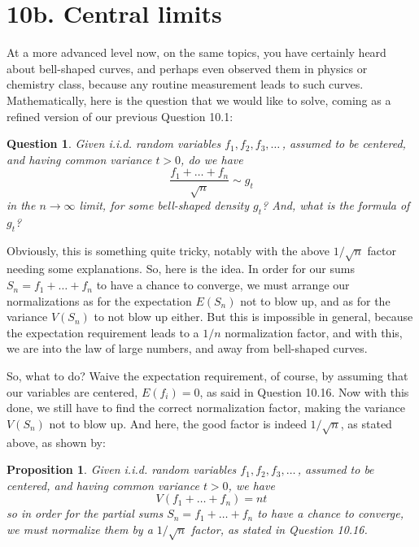 \documentclass[12pt]{amsbook}
\newtheorem{proposition}[theorem]{Proposition}
\newtheorem{question}[theorem]{Question}
\begin{document}
\section*{10b. Central limits}

At a more advanced level now, on the same topics, you have certainly heard about bell-shaped curves, and perhaps even observed them in physics or chemistry class, because any routine measurement leads to such curves. Mathematically, here is the question that we would like to solve, coming as a refined version of our previous Question 10.1:


\begin{question}
Given i.i.d. random variables $f_1,f_2,f_3,\ldots\,$, assumed to be centered, and having common variance $t>0$, do we have
$$\frac{f_1+\ldots+f_n}{\sqrt{n}}\sim g_t$$
in the $n\to\infty$ limit, for some bell-shaped density $g_t$? And, what is the formula of $g_t$? 
\end{question}

Obviously, this is something quite tricky, notably with the above $1/\sqrt{n}$ factor needing some explanations. So, here is the idea. In order for our sums $S_n=f_1+\ldots+f_n$ to have a chance to converge, we must arrange our normalizations as for the expectation $E(S_n)$ not to blow up, and as for the variance $V(S_n)$ to not blow up either. But this is impossible in general, because the expectation requirement leads to a $1/n$ normalization factor, and with this, we are into the law of large numbers, and away from bell-shaped curves.

\bigskip

So, what to do? Waive the expectation requirement, of course, by assuming that our variables are centered, $E(f_i)=0$, as said in Question 10.16. Now with this done, we still have to find the correct normalization factor, making the variance $V(S_n)$ not to blow up. And here, the good factor is indeed $1/\sqrt{n}$, as stated above, as shown by:

\begin{proposition}
Given i.i.d. random variables $f_1,f_2,f_3,\ldots\,$, assumed to be centered, and having common variance $t>0$, we have
$$V(f_1+\ldots+f_n)=nt$$
so in order for the partial sums $S_n=f_1+\ldots+f_n$ to have a chance to converge,
we must normalize them by a $1/\sqrt{n}$ factor, as stated in Question 10.16.
\end{proposition}
\end{document}
